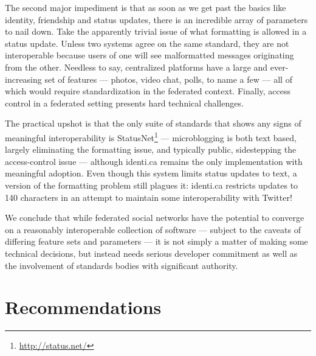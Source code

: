 \documentclass{acm_proc_article-sp}
\begin{document}
The second major impediment is that as soon as we get past the basics like identity, friendship and status updates, there is an incredible array of parameters to nail down. Take the apparently trivial issue of what formatting is allowed in a status update. Unless two systems agree on the same standard, they are not interoperable because users of one will see malformatted messages originating from the other. Needless to say, centralized platforms have a large and ever-increasing set of features --- photos, video chat, polls, to name a few --- all of which would require standardization in the federated context.  Finally, access control in a federated setting presents hard technical challenges.

The practical upshot is that the only suite of standards that shows any signs of meaningful interoperability is StatusNet\footnote{\url{http://status.net/}} --- microblogging is both text based, largely eliminating the formatting issue, and typically public, sidestepping the access-control issue ---  although identi.ca remains the only implementation with meaningful adoption. Even though this system limits status updates to text, a version of the formatting problem still plagues it: identi.ca restricts updates to 140 characters in an attempt to maintain some interoperability with Twitter!

We conclude that while federated social networks have the potential to converge on a reasonably interoperable collection of software --- subject to the caveats of differing feature sets and parameters --- it is not simply a matter of making some technical decisions, but instead needs serious developer commitment as well as the involvement of standards bodies with significant authority.

\section{Recommendations}
\label{sec:Recommendations}
\end{document}
